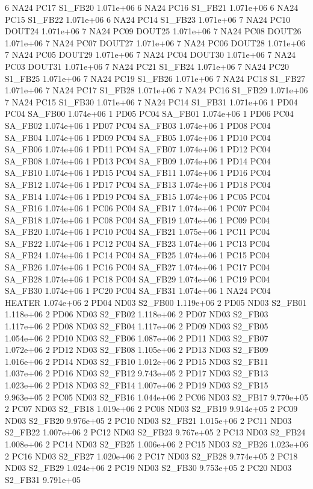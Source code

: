 6 NA24 PC17 S1_FB20 1.071e+06 
6 NA24 PC16 S1_FB21 1.071e+06 
6 NA24 PC15 S1_FB22 1.071e+06 
6 NA24 PC14 S1_FB23 1.071e+06 
7 NA24 PC10 DOUT24 1.071e+06 
7 NA24 PC09 DOUT25 1.071e+06 
7 NA24 PC08 DOUT26 1.071e+06 
7 NA24 PC07 DOUT27 1.071e+06 
7 NA24 PC06 DOUT28 1.071e+06 
7 NA24 PC05 DOUT29 1.071e+06 
7 NA24 PC04 DOUT30 1.071e+06 
7 NA24 PC03 DOUT31 1.071e+06 
7 NA24 PC21 S1_FB24 1.071e+06 
7 NA24 PC20 S1_FB25 1.071e+06 
7 NA24 PC19 S1_FB26 1.071e+06 
7 NA24 PC18 S1_FB27 1.071e+06 
7 NA24 PC17 S1_FB28 1.071e+06 
7 NA24 PC16 S1_FB29 1.071e+06 
7 NA24 PC15 S1_FB30 1.071e+06 
7 NA24 PC14 S1_FB31 1.071e+06 
1 PD04 PC04 SA_FB00 1.074e+06 
1 PD05 PC04 SA_FB01 1.074e+06 
1 PD06 PC04 SA_FB02 1.074e+06 
1 PD07 PC04 SA_FB03 1.074e+06 
1 PD08 PC04 SA_FB04 1.074e+06 
1 PD09 PC04 SA_FB05 1.074e+06 
1 PD10 PC04 SA_FB06 1.074e+06 
1 PD11 PC04 SA_FB07 1.074e+06 
1 PD12 PC04 SA_FB08 1.074e+06 
1 PD13 PC04 SA_FB09 1.074e+06 
1 PD14 PC04 SA_FB10 1.074e+06 
1 PD15 PC04 SA_FB11 1.074e+06 
1 PD16 PC04 SA_FB12 1.074e+06 
1 PD17 PC04 SA_FB13 1.074e+06 
1 PD18 PC04 SA_FB14 1.074e+06 
1 PD19 PC04 SA_FB15 1.074e+06 
1 PC05 PC04 SA_FB16 1.074e+06 
1 PC06 PC04 SA_FB17 1.074e+06 
1 PC07 PC04 SA_FB18 1.074e+06 
1 PC08 PC04 SA_FB19 1.074e+06 
1 PC09 PC04 SA_FB20 1.074e+06 
1 PC10 PC04 SA_FB21 1.075e+06 
1 PC11 PC04 SA_FB22 1.074e+06 
1 PC12 PC04 SA_FB23 1.074e+06 
1 PC13 PC04 SA_FB24 1.074e+06 
1 PC14 PC04 SA_FB25 1.074e+06 
1 PC15 PC04 SA_FB26 1.074e+06 
1 PC16 PC04 SA_FB27 1.074e+06 
1 PC17 PC04 SA_FB28 1.074e+06 
1 PC18 PC04 SA_FB29 1.074e+06 
1 PC19 PC04 SA_FB30 1.074e+06 
1 PC20 PC04 SA_FB31 1.074e+06 
1 NA24 PC04 HEATER 1.074e+06 
2 PD04 ND03 S2_FB00 1.119e+06 
2 PD05 ND03 S2_FB01 1.118e+06 
2 PD06 ND03 S2_FB02 1.118e+06 
2 PD07 ND03 S2_FB03 1.117e+06 
2 PD08 ND03 S2_FB04 1.117e+06 
2 PD09 ND03 S2_FB05 1.054e+06 
2 PD10 ND03 S2_FB06 1.087e+06 
2 PD11 ND03 S2_FB07 1.072e+06 
2 PD12 ND03 S2_FB08 1.105e+06 
2 PD13 ND03 S2_FB09 1.016e+06 
2 PD14 ND03 S2_FB10 1.012e+06 
2 PD15 ND03 S2_FB11 1.037e+06 
2 PD16 ND03 S2_FB12 9.743e+05 
2 PD17 ND03 S2_FB13 1.023e+06 
2 PD18 ND03 S2_FB14 1.007e+06 
2 PD19 ND03 S2_FB15 9.963e+05 
2 PC05 ND03 S2_FB16 1.044e+06 
2 PC06 ND03 S2_FB17 9.770e+05 
2 PC07 ND03 S2_FB18 1.019e+06 
2 PC08 ND03 S2_FB19 9.914e+05 
2 PC09 ND03 S2_FB20 9.976e+05 
2 PC10 ND03 S2_FB21 1.015e+06 
2 PC11 ND03 S2_FB22 1.007e+06 
2 PC12 ND03 S2_FB23 9.767e+05 
2 PC13 ND03 S2_FB24 1.008e+06 
2 PC14 ND03 S2_FB25 1.006e+06 
2 PC15 ND03 S2_FB26 1.023e+06 
2 PC16 ND03 S2_FB27 1.020e+06 
2 PC17 ND03 S2_FB28 9.774e+05 
2 PC18 ND03 S2_FB29 1.024e+06 
2 PC19 ND03 S2_FB30 9.753e+05 
2 PC20 ND03 S2_FB31 9.791e+05 
